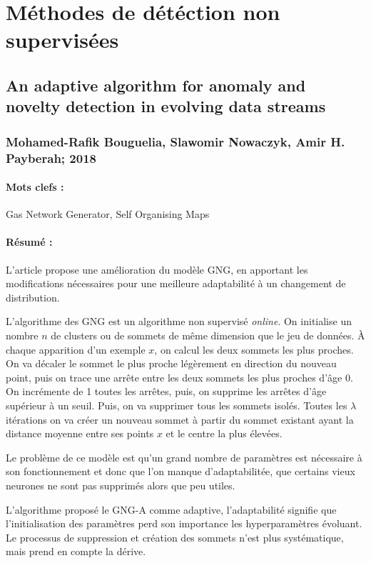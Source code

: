\documentclass[11pt,a4paper]{report}
\begin{document}
\newpage






\section{Méthodes de détéction non supervisées}

\subsection{An adaptive algorithm for anomaly and novelty detection in evolving data streams}
\subsubsection{Mohamed-Rafik Bouguelia, Slawomir Nowaczyk, Amir H. Payberah; 2018}

\paragraph{Mots clefs :}Gas Network Generator, Self Organising Maps

\paragraph{Résumé :}L'article propose une amélioration du modèle GNG, en apportant les modifications nécessaires pour une meilleure adaptabilité à un changement de distribution.

L'algorithme des GNG est un algorithme non supervisé \textit{online}. On initialise un nombre $n$ de clusters ou de sommets de même dimension que le jeu de données. À chaque apparition d'un exemple $x$, on calcul les deux sommets les plus proches. On va décaler le sommet le plus proche légèrement en direction du nouveau point, puis on trace une arrête entre les deux sommets les plus proches d'âge 0. On incrémente de 1 toutes les arrêtes, puis, on supprime les arrêtes d'âge supérieur à un seuil. Puis, on va supprimer tous les sommets isolés. Toutes les $\lambda$ itérations on va créer un nouveau sommet à partir du sommet existant ayant la distance moyenne entre ses points $x$ et le centre la plus élevées.

Le problème de ce modèle est qu'un grand nombre de paramètres est nécessaire à son fonctionnement et donc que l'on manque d'adaptabilitée, que certains vieux neurones ne sont pas supprimés alors que peu utiles.

L'algorithme proposé le GNG-A comme adaptive, l'adaptabilité signifie que l'initialisation des paramètres perd son importance les hyperparamètres évoluant. Le processus de suppression et création des sommets n'est plus systématique, mais prend en compte la dérive. 
\end{document}
